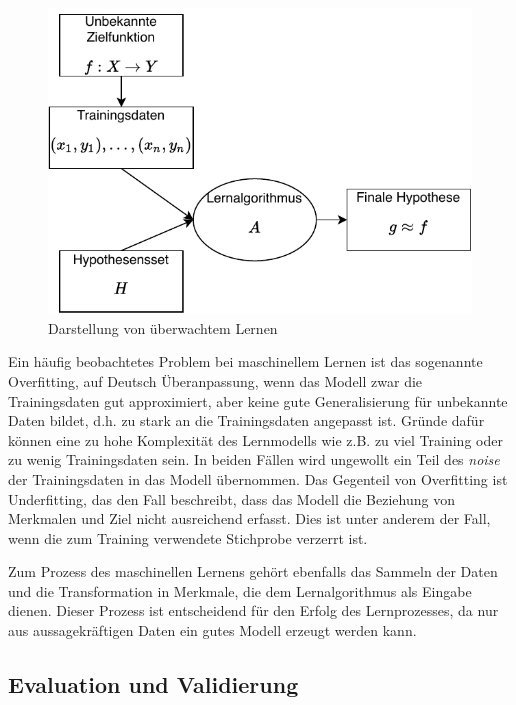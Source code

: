 	\begin{figure}[H]
		\centering
		\includegraphics{pic/SupervisedLearning.pdf}
		\caption[Darstellung von überwachtem Lernen]{Darstellung von überwachtem Lernen}
		\label{fig:supervisedLearning}
	\end{figure}

	
	Ein häufig beobachtetes Problem bei maschinellem Lernen ist das sogenannte Overfitting, auf Deutsch Überanpassung, wenn das Modell zwar die Trainingsdaten gut approximiert, aber keine gute Generalisierung für unbekannte Daten bildet, d.h. zu stark an die Trainingsdaten angepasst ist. Gründe dafür können eine zu hohe Komplexität des Lernmodells wie z.B. zu viel Training oder zu wenig Trainingsdaten sein. %
	In beiden Fällen wird ungewollt ein Teil des \textit{noise} der Trainingsdaten in das Modell übernommen. Das Gegenteil von Overfitting ist Underfitting, das den Fall beschreibt, dass das Modell die Beziehung von Merkmalen und Ziel nicht ausreichend erfasst. Dies ist unter anderem der Fall, wenn die zum Training verwendete Stichprobe verzerrt ist.
	
	Zum Prozess des maschinellen Lernens gehört ebenfalls das Sammeln der Daten und die Transformation in Merkmale, die dem Lernalgorithmus als Eingabe dienen. Dieser Prozess ist entscheidend für den Erfolg des Lernprozesses, da nur aus aussagekräftigen Daten ein gutes Modell erzeugt werden kann.

	\subsection{Evaluation und Validierung}
	
